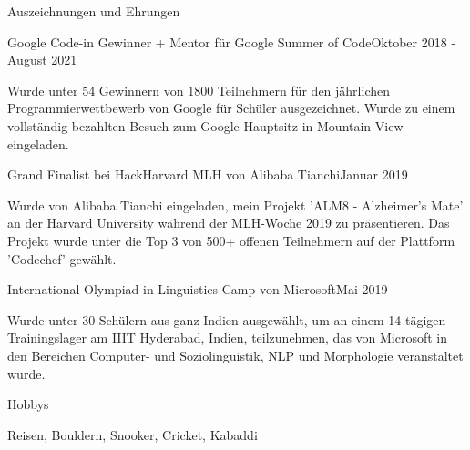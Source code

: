 \documentclass[
	a4paper, %
	10pt, %
]{resume} %
\begin{document}
\begin{rSection}{Auszeichnungen und Ehrungen}

	\begin{achSubsection}{Google Code-in Gewinner + Mentor für Google Summer of Code}{Oktober 2018 - August 2021}
		\item Wurde unter 54 Gewinnern von 1800 Teilnehmern für den jährlichen Programmierwettbewerb von Google für Schüler ausgezeichnet. Wurde zu einem vollständig bezahlten Besuch zum Google-Hauptsitz in Mountain View eingeladen.
	\end{achSubsection}




	\begin{achSubsection}{Grand Finalist bei HackHarvard MLH von Alibaba Tianchi}{Januar 2019}
		\item Wurde von Alibaba Tianchi eingeladen, mein Projekt 'ALM8 - Alzheimer's Mate' an der Harvard University während der MLH-Woche 2019 zu präsentieren. Das Projekt wurde unter die Top 3 von 500+ offenen Teilnehmern auf der Plattform 'Codechef' gewählt.
	\end{achSubsection}


	\begin{achSubsection}{International Olympiad in Linguistics Camp von Microsoft}{Mai 2019}
		\item Wurde unter 30 Schülern aus ganz Indien ausgewählt, um an einem 14-tägigen Trainingslager am IIIT Hyderabad, Indien, teilzunehmen, das von Microsoft in den Bereichen Computer- und Soziolinguistik, NLP und Morphologie veranstaltet wurde.
	\end{achSubsection}

\end{rSection}

\begin{rSection}{Hobbys}

	Reisen, Bouldern, Snooker, Cricket, Kabaddi


\end{rSection}
\end{document}
